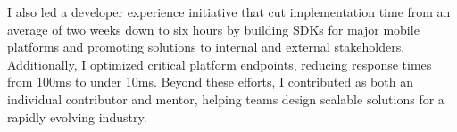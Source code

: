 \documentclass[10pt]{article}
\newcommand{\DescribedEntryTitle}[3] {
  \noindent \textit{\strong{#1}, #2} \hfill \textit{#3}
  \\
}
\begin{document}
\begin{flushleft}
{  I also led a developer experience initiative that cut implementation time
  from an average of two weeks down to six hours by building SDKs for major
  mobile platforms and promoting solutions to internal and external
  stakeholders. Additionally, I optimized critical platform endpoints, reducing
  response times from 100ms to under 10ms. Beyond these efforts, I contributed
  as both an individual contributor and mentor, helping teams design scalable
  solutions for a rapidly evolving industry.
}
\vspace{.1in}

\iftoggle{MODELONG}{
  \DescribedEntryTitle{Software Engineer, Freelance}{Minond, LLC}{May 2017 - April 2018}{
    Helped companies dismantle and analyze problems, develop and vet new ideas and solutions, and build mission-critical products.
  }
}{
  \DescribedEntryTitle{Software Engineer, Freelance}{Minond, LLC}{May 2017 - April 2018}
}
\vspace{.1in}


\end{flushleft}
\end{document}
